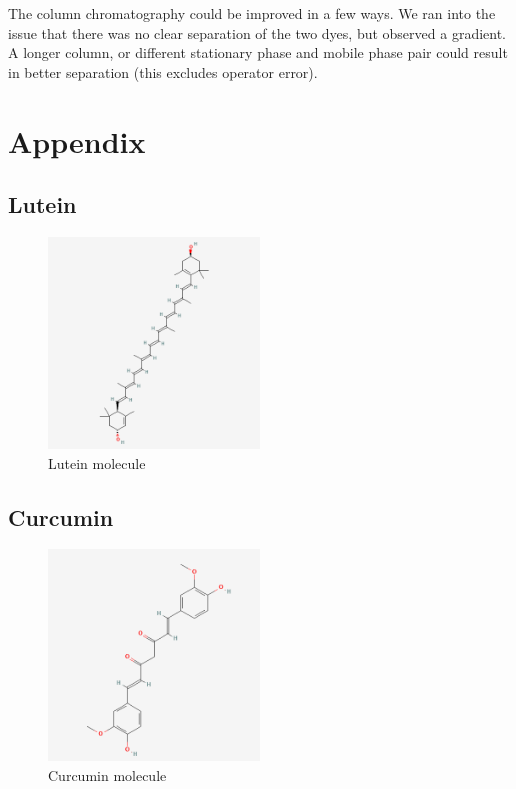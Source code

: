 \documentclass{article}
\begin{document}
The column chromatography could be improved in a few ways. We ran into the issue that there was no clear separation of the two dyes, but observed a gradient. A longer column, or different stationary phase and mobile phase pair could result in better separation (this excludes operator error). 

\vfill
\newpage

\section{Appendix}

\subsection{Lutein}

\begin{figure}[!ht]
    \centering
    \includegraphics[width=0.5\textwidth]{Molecules/Lutein_500.png}
    \caption{Lutein molecule}
    \label{fig:lutein}
\end{figure}
\FloatBarrier

\subsection{Curcumin}

\begin{figure}[!ht]
    \centering
    \includegraphics[width=0.5\textwidth]{Molecules/Curcumin_500.png}
    \caption{Curcumin molecule}
    \label{fig:curcumin}
\end{figure}
\FloatBarrier
\end{document}
